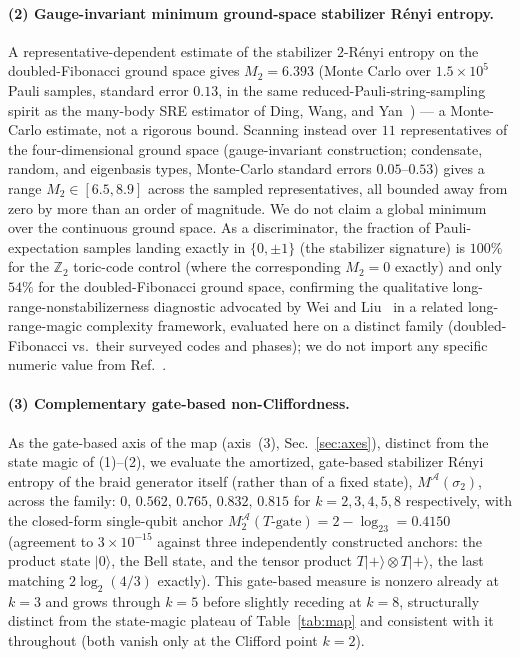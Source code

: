 \documentclass[aps,pra,twocolumn,superscriptaddress,longbibliography,floatfix,nofootinbib]{revtex4-2}
\providecommand{\ket}[1]{\lvert #1 \rangle}
\begin{document}
\paragraph{(2) Gauge-invariant minimum ground-space stabilizer Rényi
entropy.} A representative-dependent estimate of the stabilizer
$2$-Rényi entropy on the doubled-Fibonacci ground space gives
$M_2=6.393$ (Monte Carlo over $1.5\times10^5$ Pauli samples, standard
error $0.13$, in the same reduced-Pauli-string-sampling spirit as the
many-body SRE estimator of Ding, Wang, and
Yan~\cite{Ding2025}) --- a Monte-Carlo estimate, not a rigorous bound.
Scanning instead over $11$ representatives of the four-dimensional
ground space (gauge-invariant construction; condensate, random, and
eigenbasis types, Monte-Carlo standard errors $0.05$--$0.53$) gives a
range $M_2\in[6.5,8.9]$ across the sampled representatives, all bounded
away from zero by more than an order of magnitude. We do not claim a
global minimum over the continuous ground space. As a
discriminator, the fraction of Pauli-expectation samples landing
exactly in $\{0,\pm1\}$ (the stabilizer signature) is $100\%$ for the
$\mathbb{Z}_2$ toric-code control (where the corresponding $M_2=0$
exactly) and only $54\%$ for the doubled-Fibonacci ground space,
confirming the qualitative long-range-nonstabilizerness diagnostic
advocated by Wei and Liu~\cite{WeiLiu2025} in a related
long-range-magic complexity framework, evaluated here on a distinct
family (doubled-Fibonacci vs.\ their surveyed codes and phases); we
do not import any specific numeric value from Ref.~\cite{WeiLiu2025}.

\paragraph{(3) Complementary gate-based non-Cliffordness.} As the
gate-based axis of the map (axis~(3), Sec.~\ref{sec:axes}), distinct
from the state magic of (1)--(2), we evaluate the amortized,
gate-based stabilizer Rényi entropy of the braid generator
itself (rather than of a fixed state), $M^{\mathcal A}(\sigma_2)$,
across the family: $0,\,0.562,\,0.765,\,0.832,\,0.815$ for
$k=2,3,4,5,8$ respectively, with the closed-form single-qubit anchor
$M_2^{\mathcal A}(T\text{-gate})=2-\log_23=0.4150$ (agreement to
$3\times10^{-15}$ against three independently constructed anchors:
the product state $\ket0$, the Bell state, and the tensor product
$T\ket+\otimes T\ket+$, the last matching $2\log_2(4/3)$ exactly).
This gate-based measure is nonzero already at $k=3$ and grows through
$k=5$ before slightly receding at $k=8$, structurally distinct from
the state-magic plateau of Table~\ref{tab:map} and consistent with it
throughout (both vanish only at the Clifford point $k=2$).
\end{document}
